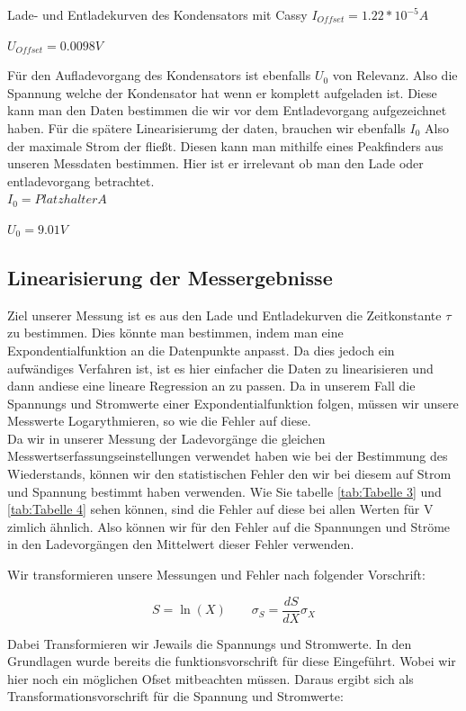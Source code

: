 \documentclass[twoside]{protokoll}
\begin{document}
\begin{aufgabe}{Lade- und Entladekurven des Kondensators mit Cassy}
$I_{Offset} = 1.22 * 10^{-5} A$

$U_{Offset} = 0.0098 V$

Für den Aufladevorgang des Kondensators ist ebenfalls $U_0$ von Relevanz. Also die Spannung welche der Kondensator hat wenn er komplett aufgeladen ist. 
Diese kann man den Daten bestimmen die wir vor dem Entladevorgang aufgezeichnet haben. 
Für die spätere Linearisierumg der daten, brauchen wir ebenfalls $I_0$ Also der maximale Strom der fließt. Diesen kann man mithilfe eines Peakfinders aus unseren Messdaten bestimmen.
Hier ist er irrelevant ob man den Lade oder entladevorgang betrachtet.\\

$ I_0 = Platzhalter A$

$ U_0 = 9.01 V $


\subsection{Linearisierung der Messergebnisse}

Ziel unserer Messung ist es aus den Lade und Entladekurven die Zeitkonstante $\tau$ zu bestimmen. 
Dies könnte man bestimmen, indem man eine Expondentialfunktion an die Datenpunkte  anpasst.
Da dies jedoch ein aufwändiges Verfahren ist, ist es hier einfacher die Daten zu linearisieren und dann andiese eine lineare Regression an zu passen. 
Da in unserem Fall die Spannungs und Stromwerte einer Expondentialfunktion folgen, müssen wir unsere Messwerte Logarythmieren, so wie die Fehler auf diese.\\

Da wir in unserer Messung der Ladevorgänge die gleichen Messwertserfassungseinstellungen verwendet haben wie bei der Bestimmung des Wiederstands, können wir den statistischen Fehler den wir bei diesem auf Strom und Spannung bestimmt haben verwenden.
Wie Sie tabelle  \ref{tab:Tabelle 3} und \ref{tab:Tabelle 4} sehen können, sind die Fehler auf diese bei allen Werten für V zimlich ähnlich. 
Also können wir für den Fehler auf die Spannungen und Ströme in den Ladevorgängen den Mittelwert dieser Fehler verwenden.

Wir transformieren unsere Messungen und Fehler nach folgender Vorschrift:

\begin{equation}
	S = \ln(X) \qquad \sigma_S = \frac{dS}{dX} \sigma_X
\end{equation}

Dabei Transformieren wir Jewails die Spannungs und Stromwerte. In den Grundlagen wurde bereits die funktionsvorschrift für diese Eingeführt. Wobei wir hier noch ein möglichen Ofset mitbeachten müssen. Daraus ergibt sich als Transformationsvorschrift für die Spannung und Stromwerte:


\end{aufgabe}
\end{document}
